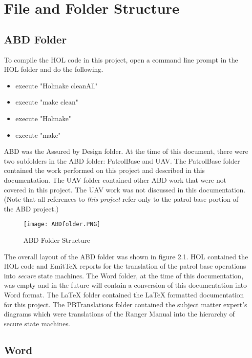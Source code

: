 
\chapter{File and Folder Structure}
\label{cha:file-fold-struct}

\section{ABD Folder}
\label{sec:abd-folder}

To compile the HOL code in this project, open a command line prompt in the HOL folder and do the following.
\begin{itemize}
  \item execute "Holmake cleanAll"
\item execute "make clean"
\item execute "Holmake"
\item execute "make"
\end{itemize}

ABD was the Assured by Design folder.  At the time of this document, there were two subfolders in the ABD
folder: PatrolBase and UAV.  The PatrolBase folder contained the work performed on this project and described
in this documentation.  The UAV folder contained other ABD work that were not covered in this project.
The UAV work was not discussed in this documentation.  (Note that all references to \emph{this project}
refer only to the patrol base portion of the ABD project.)\\

 \begin{figure}[h]
  \centering
  \texttt{[image: ABDfolder.PNG]}
  \caption{ABD Folder Structure}
\end{figure}

The overall layout of the ABD folder was shown in figure 2.1.   HOL contained the HOL code and EmitTeX
reports for the translation of the patrol base operations into \emph{secure} state machines.  The Word
folder, at the time of this documentation, was empty and in the future will contain a conversion of this
documentation into Word format.  The LaTeX folder contained the LaTeX formatted documentation for this
project.  The PBTranslations folder contained the subject matter expert's diagrams which were translations
of the Ranger Manual into the hierarchy of secure state machines.

 

\section{Word}
\label{sec:word}

